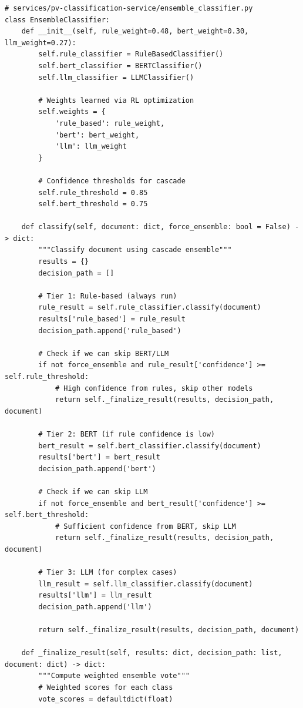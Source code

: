\begin{lstlisting}[style=pythonstyle]
# services/pv-classification-service/ensemble_classifier.py
class EnsembleClassifier:
    def __init__(self, rule_weight=0.48, bert_weight=0.30, llm_weight=0.27):
        self.rule_classifier = RuleBasedClassifier()
        self.bert_classifier = BERTClassifier()
        self.llm_classifier = LLMClassifier()
        
        # Weights learned via RL optimization
        self.weights = {
            'rule_based': rule_weight,
            'bert': bert_weight,
            'llm': llm_weight
        }
        
        # Confidence thresholds for cascade
        self.rule_threshold = 0.85
        self.bert_threshold = 0.75
    
    def classify(self, document: dict, force_ensemble: bool = False) -> dict:
        """Classify document using cascade ensemble"""
        results = {}
        decision_path = []
        
        # Tier 1: Rule-based (always run)
        rule_result = self.rule_classifier.classify(document)
        results['rule_based'] = rule_result
        decision_path.append('rule_based')
        
        # Check if we can skip BERT/LLM
        if not force_ensemble and rule_result['confidence'] >= self.rule_threshold:
            # High confidence from rules, skip other models
            return self._finalize_result(results, decision_path, document)
        
        # Tier 2: BERT (if rule confidence is low)
        bert_result = self.bert_classifier.classify(document)
        results['bert'] = bert_result
        decision_path.append('bert')
        
        # Check if we can skip LLM
        if not force_ensemble and bert_result['confidence'] >= self.bert_threshold:
            # Sufficient confidence from BERT, skip LLM
            return self._finalize_result(results, decision_path, document)
        
        # Tier 3: LLM (for complex cases)
        llm_result = self.llm_classifier.classify(document)
        results['llm'] = llm_result
        decision_path.append('llm')
        
        return self._finalize_result(results, decision_path, document)
    
    def _finalize_result(self, results: dict, decision_path: list, document: dict) -> dict:
        """Compute weighted ensemble vote"""
        # Weighted scores for each class
        vote_scores = defaultdict(float)
        

\end{lstlisting}
